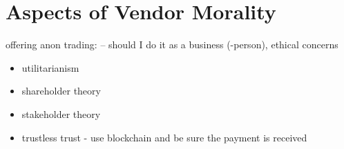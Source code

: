 \section{Aspects of Vendor Morality}

offering anon trading: -- should I do it as a business (-person), ethical concerns
\begin{itemize}
    \item utilitarianism
    \item shareholder theory
    \item stakeholder theory
    \item trustless trust - use blockchain and be sure the payment is received
\end{itemize}